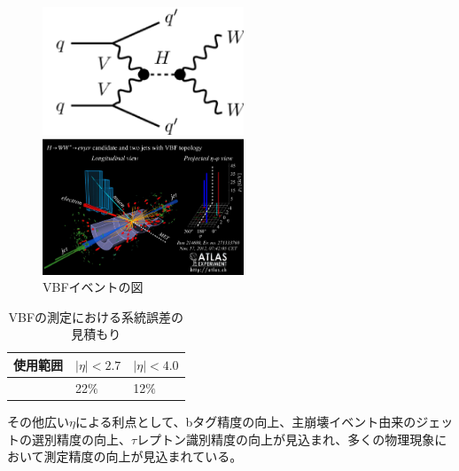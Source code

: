 \begin{figure}[bpt]
  \begin{minipage}{0.4\hsize}
    \begin{center}
    \includegraphics[width=60mm]{VBF_fainman}
    \end{center}
  \end{minipage}
  \begin{minipage}{0.4\hsize}
    \begin{center}
    \includegraphics[width=60mm]{VBF_event_display}
    \end{center}
  \end{minipage}
  \caption[VBFイベントの図]{VBFイベントの図}
  \label{VBF_image}
\end{figure}

\begin{table}[tbp]
\begin{center}
\caption[VBFの測定における系統誤差の見積もり]{VBFの測定における系統誤差の見積もり}
\label{compare_itk_pixel}
  \begin{tabular}{|lll|} \hline
    使用範囲 & $|\eta| <2.7 $ & $|\eta| < 4.0 $ \\ \hline
    & 22$\%$ & 12$\%$ \\ \hline
  \end{tabular}
\end{center}
\end{table}

その他広い$\eta$による利点として、bタグ精度の向上、主崩壊イベント由来のジェットの選別精度の向上、$\tau$レプトン識別精度の向上が見込まれ、多くの物理現象において測定精度の向上が見込まれている。
